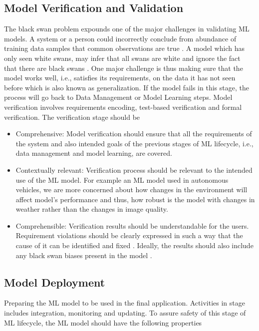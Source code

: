 \subsection{Model Verification and Validation} 
The black swan problem expounds one of the major challenges in validating ML models. A system or a person could incorrectly conclude from abundance of training data samples that common observations are true \cite{koopman2016challenges}. A model which has only seen white swans, may infer that all swans are white and ignore the fact that there are black swans \cite{taleb2007the}. One major challenge is thus making sure that the model works well, i.e., satisfies its requirements, on the data it has not seen before which is also known as generalization. If the model fails in this stage, the process will go back to Data Management or Model Learning steps. Model verification involves requirements encoding, test-based verification and formal verification. The verification stage should be \cite{Ashmore2021}
\begin{itemize}
    \item Comprehensive: Model verification should ensure that all the requirements of the system and also intended goals of the previous stages of ML lifecycle, i.e., data management and model learning, are covered.
    \item Contextually relevant: Verification process should be relevant to the intended use of the ML model. For example an ML model used in autonomous vehicles, we are more concerned about how changes in the environment will affect model's performance and thus, how robust is the model with changes in weather rather than the changes in image quality. 
    \item Comprehensible: Verification results should be understandable for the users. Requirement violations should be clearly expressed in such a way that the cause of it can be identified and fixed \cite{Ashmore2021}. Ideally, the results should also include any black swan biases present in the model \cite{koopman2016challenges}.
\end{itemize}

\subsection{Model Deployment} 
Preparing the ML model to be used in the final application. Activities in stage includes integration, monitoring and updating. To assure safety of this stage of ML lifecycle, the ML model should have the following properties

